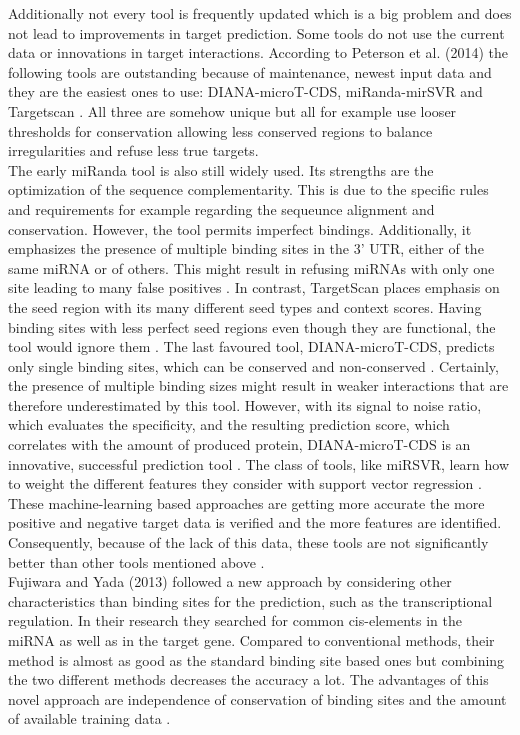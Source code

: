 \documentclass[11pt, a4paper, oneside]{book}
\begin{document}
Additionally not every tool is frequently updated which is a big problem and does not lead to improvements in target prediction. Some tools do not use the current data or innovations in target interactions. According to Peterson et al. (2014) the following tools are outstanding because of maintenance, newest input data and they are the easiest ones to use: DIANA-microT-CDS, miRanda-mirSVR and Targetscan \cite{Peterson}. All three are somehow unique but all for example use looser thresholds for conservation allowing less conserved regions to balance irregularities and refuse less true targets.\\

The early miRanda tool is also still widely used. Its strengths are the optimization of the sequence complementarity. This is due to the specific rules and requirements for example regarding the sequeunce alignment and conservation. However, the tool permits imperfect bindings. Additionally, it emphasizes the presence of multiple binding sites in the 3' UTR, either of the same miRNA or of others. This might result in refusing miRNAs with only one site leading to many false positives \cite{John}. In contrast, TargetScan places emphasis on the seed region with its many different seed types and context scores. Having binding sites with less perfect seed regions even though they are functional, the tool would ignore them \cite{Lewis}. The last favoured tool, DIANA-microT-CDS, predicts only single binding sites, which can be conserved and non-conserved \cite{Kiriakidou}. Certainly, the presence of multiple binding sizes might result in weaker interactions that are therefore underestimated by this tool. However, with its signal to noise ratio, which evaluates the specificity, and the resulting prediction score, which correlates with the amount of produced protein, DIANA-microT-CDS is an innovative, successful prediction tool \cite{Maragkakis}. The class of tools, like miRSVR, learn how to weight the different features they consider with support vector regression \cite{Betel}. These machine-learning based approaches are getting more accurate the more positive and negative target data is verified and the more features are identified. Consequently, because of the lack of this data, these tools are not significantly better than other tools mentioned above \cite{Peterson}. \\

Fujiwara and Yada (2013) followed a new approach by considering other characteristics than binding sites for the prediction, such as the transcriptional regulation. In their research they searched for common cis-elements in the miRNA as well as in the target gene. Compared to conventional methods, their method is almost as good as the standard binding site based ones but combining the two different methods decreases the accuracy a lot. The advantages of this novel approach are independence of conservation of binding sites and the amount of available training data \cite{Fuji}. \\
\end{document}
